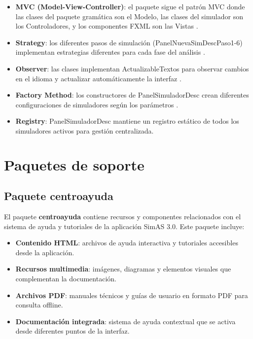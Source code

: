 \begin{itemize}
    \item \textbf{MVC (Model-View-Controller)}: el paquete sigue el patrón MVC donde las clases del paquete gramática son el Modelo, las clases del simulador son los Controladores, y los componentes FXML son las Vistas \cite{burbeck1992applications}.
    \item \textbf{Strategy}: los diferentes pasos de simulación (PanelNuevaSimDescPaso1-6) implementan estrategias diferentes para cada fase del análisis \cite{gamma1995design}.
    \item \textbf{Observer}: las clases implementan ActualizableTextos para observar cambios en el idioma y actualizar automáticamente la interfaz \cite{gamma1995design}.
    \item \textbf{Factory Method}: los constructores de PanelSimuladorDesc crean diferentes configuraciones de simuladores según los parámetros \cite{gamma1995design}.
    \item \textbf{Registry}: PanelSimuladorDesc mantiene un registro estático de todos los simuladores activos para gestión centralizada.
\end{itemize}

\section{Paquetes de soporte}

\subsection{Paquete centroayuda}

El paquete \textbf{centroayuda} contiene recursos y componentes relacionados con el sistema de ayuda y tutoriales de la aplicación SimAS 3.0. Este paquete incluye:

\begin{itemize}
    \item \textbf{Contenido HTML}: archivos de ayuda interactiva y tutoriales accesibles desde la aplicación.
    \item \textbf{Recursos multimedia}: imágenes, diagramas y elementos visuales que complementan la documentación.
    \item \textbf{Archivos PDF}: manuales técnicos y guías de usuario en formato PDF para consulta offline.
    \item \textbf{Documentación integrada}: sistema de ayuda contextual que se activa desde diferentes puntos de la interfaz.
\end{itemize}

